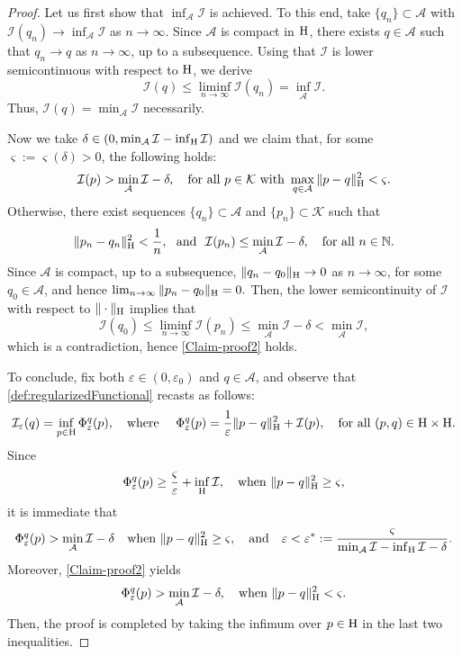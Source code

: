 \documentclass{article}
\newcommand{\boK}{\mathcal{K}}
\newcommand{\boI}{\mathcal{I}}
\newcommand{\boA}{\mathcal{A}}
\newcommand{\Hilb}{{\textnormal H}}
\theoremstyle{definition}
\begin{document}
\begin{proof}
Let us first show that $\inf_{\boA}\boI$ is achieved. To this end, take $\{q_n\}\subset \boA$ with $\boI(q_n)\to \inf_{\boA}\boI$ as $n\to\infty$. Since $\boA$ is compact in $\Hilb$, there exists $q\in\boA$ such that $q_n\to q$ as $n\to\infty$, up to a subsequence. Using that $\boI$ is lower semicontinuous with respect to $\Hilb$, we derive
\begin{equation}
\boI(q)\leq\liminf_{n\to\infty}\boI(q_n)=\inf_{\boA}\boI.
\end{equation}
Thus, $\boI(q)=\min_{\boA}\boI$ necessarily. 

Now we take $\delta\in(0,\min_\boA\boI-\inf_\Hilb\boI)$ and we claim that, for some $\varsigma:=\varsigma(\delta)>0$, the following holds: 
\begin{equation}\label{Claim-proof2}
	\boI(p)>\min_\boA\boI-\delta,\quad\hbox{for all }p\in\boK\hbox{ with }\max_{q\in\boA}\|p-q\|^2_\Hilb<\varsigma.
\end{equation}
Otherwise, there exist sequences $\{q_n\}\subset\boA$ and $\{p_n\}\subset\boK$ such that
\begin{equation}
 \|p_n-q_n\|_\Hilb^2<\dfrac{1}{n},\ \hbox{ and }\ \boI(p_n)\leq \min_\boA\boI-\delta,\quad\hbox{for all }n\in\mathbb{N}.
\end{equation}
Since $\boA$ is compact, up to a subsequence,  $\|q_n-q_0\|_\Hilb\to 0$ as $n\to\infty$, for some $q_0\in \boA$, and hence $\lim_{n\to\infty}\|p_n-q_0\|_\Hilb=0.$ Then, the lower semicontinuity of $\boI$ with respect to $\|\cdot\|_\Hilb$ implies that
\begin{equation}
	\boI(q_0)\leq\liminf_{n\to\infty}\boI(p_n)\leq\min_\boA\boI-\delta<\min_\boA\boI,
\end{equation}
which is a contradiction, hence \eqref{Claim-proof2} holds.

To conclude, fix both $\varepsilon\in(0,\varepsilon_0)$ and $q\in\boA$, and observe that \eqref{def:regularizedFunctional} recasts as follows:
\begin{equation}
	\boI_\varepsilon(q)=\inf_{p\in\Hilb}\Phi_\varepsilon^q(p),\quad\hbox{where }\quad\Phi_\varepsilon^q(p)=\dfrac{1}{\varepsilon}\|p-q\|_\Hilb^2+ \boI(p),\quad\hbox{for all }(p,q)\in\Hilb\times\Hilb.
\end{equation}
Since
\begin{equation}
	\Phi_\varepsilon^q(p)\geq\dfrac{\varsigma}{\varepsilon}+\inf_\Hilb\boI,\quad\hbox{when }\|p-q\|_\Hilb^2\geq\varsigma,
\end{equation}
it is immediate that
\begin{equation}\label{proof:ineqPhi2}
	\Phi_\varepsilon^q(p)>\min_\boA\boI-\delta\quad\hbox{when }\|p-q\|_\Hilb^2\geq\varsigma,\quad\hbox{and}\quad\varepsilon<\varepsilon^*:=\dfrac{\varsigma}{\min_\boA\boI-\inf_\Hilb\boI-\delta}.
\end{equation}
Moreover, \eqref{Claim-proof2} yields
\begin{equation}\label{proof:ineqPhi1}
	\Phi_\varepsilon^q(p)>\min_\boA\boI-\delta,\quad\hbox{when }\|p-q\|_\Hilb^2<\varsigma.
\end{equation}
Then, the proof is completed by taking the infimum over $p\in\Hilb$ in the last two inequalities.
\end{proof}
\end{document}
